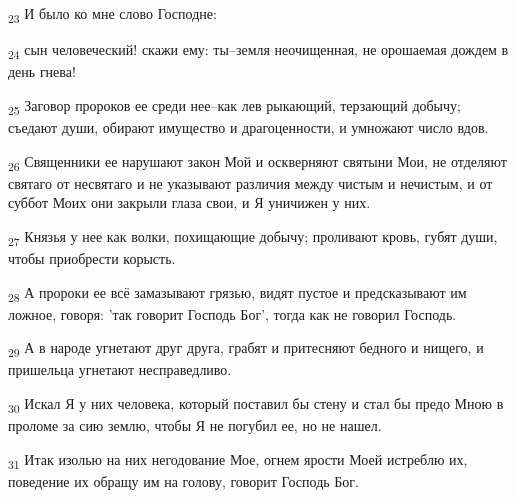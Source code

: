 \begin{tcolorbox}
\textsubscript{23} И было ко мне слово Господне:
\end{tcolorbox}
\begin{tcolorbox}
\textsubscript{24} сын человеческий! скажи ему: ты--земля неочищенная, не орошаемая дождем в день гнева!
\end{tcolorbox}
\begin{tcolorbox}
\textsubscript{25} Заговор пророков ее среди нее--как лев рыкающий, терзающий добычу; съедают души, обирают имущество и драгоценности, и умножают число вдов.
\end{tcolorbox}
\begin{tcolorbox}
\textsubscript{26} Священники ее нарушают закон Мой и оскверняют святыни Мои, не отделяют святаго от несвятаго и не указывают различия между чистым и нечистым, и от суббот Моих они закрыли глаза свои, и Я уничижен у них.
\end{tcolorbox}
\begin{tcolorbox}
\textsubscript{27} Князья у нее как волки, похищающие добычу; проливают кровь, губят души, чтобы приобрести корысть.
\end{tcolorbox}
\begin{tcolorbox}
\textsubscript{28} А пророки ее всё замазывают грязью, видят пустое и предсказывают им ложное, говоря: 'так говорит Господь Бог', тогда как не говорил Господь.
\end{tcolorbox}
\begin{tcolorbox}
\textsubscript{29} А в народе угнетают друг друга, грабят и притесняют бедного и нищего, и пришельца угнетают несправедливо.
\end{tcolorbox}
\begin{tcolorbox}
\textsubscript{30} Искал Я у них человека, который поставил бы стену и стал бы предо Мною в проломе за сию землю, чтобы Я не погубил ее, но не нашел.
\end{tcolorbox}
\begin{tcolorbox}
\textsubscript{31} Итак изолью на них негодование Мое, огнем ярости Моей истреблю их, поведение их обращу им на голову, говорит Господь Бог.
\end{tcolorbox}
